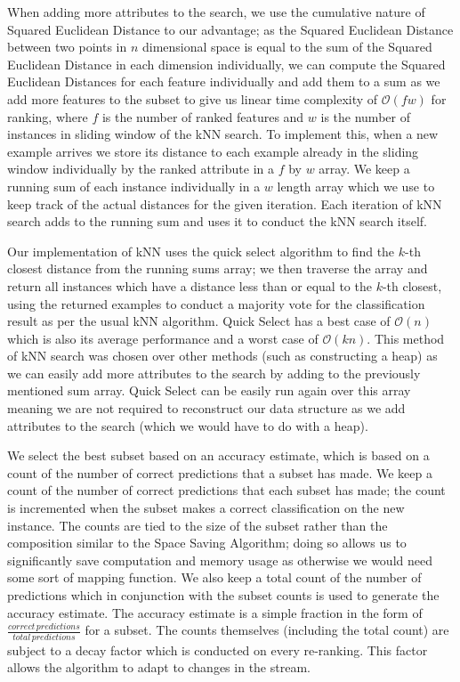 When adding more attributes to the search, we use the cumulative nature of Squared Euclidean Distance to our advantage; as the Squared Euclidean Distance between two points in $n$ dimensional space is equal to the sum of the Squared Euclidean Distance in each dimension individually, we can compute the Squared Euclidean Distances for each feature individually and add them to a sum as we add more features to the subset to give us linear time complexity of $\mathcal{O}(fw)$ for ranking, where $f$ is the number of ranked features and $w$ is the number of instances in sliding window of the kNN search. To implement this, when a new example arrives we store its distance to each example already in the sliding window individually by the ranked attribute in a $f$ by $w$ array. We keep a running sum of each instance individually in a $w$ length array which we use to keep track of the actual distances for the given iteration. Each iteration of kNN search adds to the running sum and uses it to conduct the kNN search itself.

Our implementation of kNN uses the quick select algorithm \citep{Hoare:1961:AF:366622.366647} to find the $k$-th closest distance from the running sums array; we then traverse the array and return all instances which have a distance less than or equal to the $k$-th closest, using the returned examples to conduct a majority vote for the classification result as per the usual kNN algorithm. Quick Select has a best case of  $\mathcal{O}(n)$ which is also its average performance and a worst case of  $\mathcal{O}(kn)$. This method of kNN search was chosen over other methods (such as constructing a heap) as we can easily add more attributes to the search by adding to the previously mentioned sum array. Quick Select can be easily run again over this array meaning we are not required to reconstruct our data structure as we add attributes to the search (which we would have to do with a heap).

We select the best subset based on an accuracy estimate, which is based on a count of the number of correct predictions that a subset has made. We keep a count of the number of correct predictions that each subset has made; the count is incremented when the subset makes a correct classification on the new instance. The counts are tied to the size of the subset rather than the composition similar to the Space Saving Algorithm; doing so allows us to significantly save computation and memory usage as otherwise we would need some sort of mapping function. We also keep a total count of the number of predictions which in conjunction with the subset counts is used to generate the accuracy estimate. The accuracy estimate is a simple fraction in the form of 
$\frac
{
	correct \, predictions
}
{
	total \, predictions
}$ for a subset. The counts themselves (including the total count) are subject to a decay factor which is conducted on every re-ranking. This factor allows the algorithm to adapt to changes in the stream.

